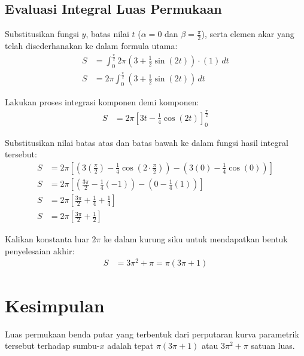 \documentclass[11pt,a4paper]{article}
\begin{document}
\subsection{Evaluasi Integral Luas Permukaan}
Substitusikan fungsi $y$, batas nilai $t$ ($\alpha = 0$ dan $\beta = \frac{\pi}{2}$), serta elemen akar yang telah disederhanakan ke dalam formula utama:
\begin{align*}
  S &= \int_{0}^{\frac{\pi}{2}} 2\pi \left( 3 + \frac{1}{2}\sin(2t) \right) \cdot (1) \, dt \\
  S &= 2\pi \int_{0}^{\frac{\pi}{2}} \left( 3 + \frac{1}{2}\sin(2t) \right) \, dt
\end{align*}

Lakukan proses integrasi komponen demi komponen:
\begin{align*}
  S &= 2\pi \left[ 3t - \frac{1}{4}\cos(2t) \right]_{0}^{\frac{\pi}{2}}
\end{align*}

Substitusikan nilai batas atas dan batas bawah ke dalam fungsi hasil integral tersebut:
\begin{align*}
  S &= 2\pi \left[ \left( 3\left(\frac{\pi}{2}\right) - \frac{1}{4}\cos\left(2 \cdot \frac{\pi}{2}\right) \right) - \left( 3(0) - \frac{1}{4}\cos(0) \right) \right] \\
  S &= 2\pi \left[ \left( \frac{3\pi}{2} - \frac{1}{4}(-1) \right) - \left( 0 - \frac{1}{4}(1) \right) \right] \\
  S &= 2\pi \left[ \frac{3\pi}{2} + \frac{1}{4} + \frac{1}{4} \right] \\
  S &= 2\pi \left[ \frac{3\pi}{2} + \frac{1}{2} \right]
\end{align*}

Kalikan konstanta luar $2\pi$ ke dalam kurung siku untuk mendapatkan bentuk penyelesaian akhir:
\begin{align*}
  S &= 3\pi^2 + \pi = \pi(3\pi + 1)
\end{align*}

\section{Kesimpulan}
Luas permukaan benda putar yang terbentuk dari perputaran kurva parametrik tersebut terhadap sumbu-$x$ adalah tepat \textbf{$\pi(3\pi + 1)$} atau \textbf{$3\pi^2 + \pi$} satuan luas.
\end{document}
